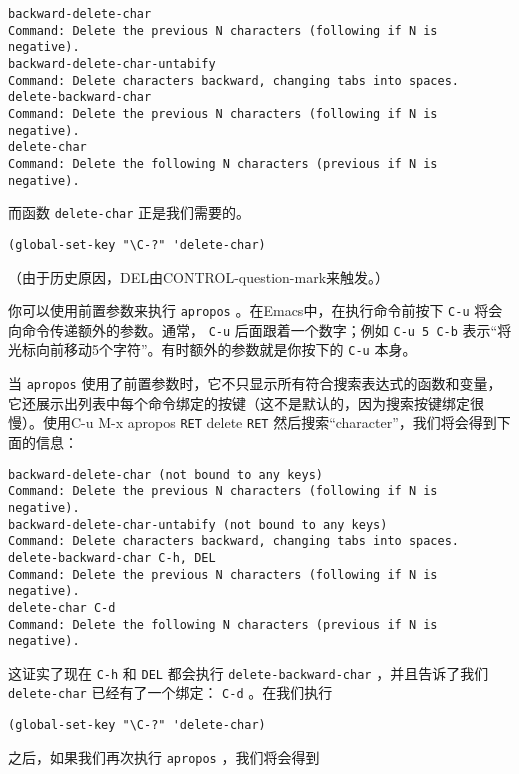 \begin{verbatim}
backward-delete-char 
Command: Delete the previous N characters (following if N is negative). 
backward-delete-char-untabify 
Command: Delete characters backward, changing tabs into spaces. 
delete-backward-char 
Command: Delete the previous N characters (following if N is negative). 
delete-char 
Command: Delete the following N characters (previous if N is negative). 
\end{verbatim}

而函数 \texttt{delete-char} 正是我们需要的。

\begin{verbatim}
(global-set-key "\C-?" 'delete-char)
\end{verbatim}

（由于历史原因，DEL由CONTROL-question-mark来触发。）

你可以使用前置参数来执行 \texttt{apropos} 。在Emacs中，在执行命令前按下 \verb|C-u| 将会向命令传递额外的参数。通常， \verb|C-u| 后面跟着一个数字；例如 \verb|C-u 5 C-b| 表示“将光标向前移动5个字符”。有时额外的参数就是你按下的 \verb|C-u| 本身。

当 \texttt{apropos} 使用了前置参数时，它不只显示所有符合搜索表达式的函数和变量，它还展示出列表中每个命令绑定的按键（这不是默认的，因为搜索按键绑定很慢）。使用C-u M-x apropos \verb|RET| delete \verb|RET| 然后搜索“character”，我们将会得到下面的信息：

\begin{verbatim}
backward-delete-char (not bound to any keys) 
Command: Delete the previous N characters (following if N is negative). 
backward-delete-char-untabify (not bound to any keys) 
Command: Delete characters backward, changing tabs into spaces. 
delete-backward-char C-h, DEL 
Command: Delete the previous N characters (following if N is negative). 
delete-char C-d 
Command: Delete the following N characters (previous if N is negative). 
\end{verbatim}

这证实了现在 \verb|C-h| 和 \verb|DEL| 都会执行 \texttt{delete-backward-char} ，并且告诉了我们 \texttt{delete-char} 已经有了一个绑定： \verb|C-d| 。在我们执行

\begin{verbatim}
(global-set-key "\C-?" 'delete-char)
\end{verbatim}

之后，如果我们再次执行 \texttt{apropos} ，我们将会得到

